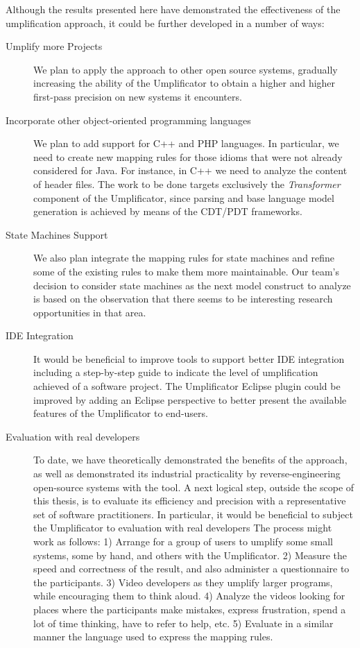 Although the results presented here have demonstrated the effectiveness of the umplification approach, it could be further developed in a number of ways:

\begin{description}
\item[Umplify more Projects] We plan to apply the approach to other open source systems, gradually increasing the ability of the Umplificator to obtain a higher and higher first-pass precision on new systems it encounters.
\item[Incorporate other object-oriented programming languages] We plan to add support for C++ and PHP languages. In particular, we need to create new mapping rules for those idioms that were not already considered for Java. For instance, in C++ we need to analyze the content of header files. The work to be done targets exclusively the \textit{Transformer} component of the Umplificator, since parsing and base language model generation is achieved by means of the CDT/PDT frameworks.
\item[State Machines Support] We also plan integrate the mapping rules for state machines and refine some of the existing rules to make them more maintainable. Our team's decision to consider state machines as the next model construct to analyze is based on the observation that there seems to be interesting research opportunities in that area.

\item[IDE Integration] It would be beneficial to improve tools to support better IDE integration including a step-by-step guide to indicate the level of umplification achieved of a software project. The Umplificator Eclipse plugin could be improved by adding an Eclipse perspective to better present the available features of the Umplificator to end-users.

\item[Evaluation with real developers] To date, we have theoretically demonstrated the benefits of the approach, as well as demonstrated its industrial practicality by  reverse-engineering open-source systems with the tool.  A next logical step, outside the scope of this thesis, is to evaluate its efficiency and precision with a representative set of software practitioners.  In particular,  it would be beneficial to subject the Umplificator to evaluation with real developers The process might work as follows: 1) Arrange for a group of users to umplify some small systems, some by hand, and others with the Umplificator. 2) Measure the speed and correctness of the result, and also administer a questionnaire to the participants. 3) Video developers as they umplify larger programs, while  encouraging them to think aloud. 4) Analyze the videos looking for places where the participants make mistakes, express frustration, spend a lot of time thinking, have to refer to help, etc. 5) Evaluate in a similar manner the language used to express the mapping rules. 


\end{description}
